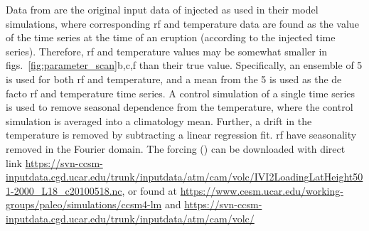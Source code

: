 \documentclass{ametsocV6.1}
\newcommand{\iso}[1][i]{{#1}njected \ce{SO2}}
\begin{document}
%






%



\appendix


Data from \citet{ottobliesner2016} are the original input data of \iso{} as used in
their model simulations, where corresponding \gls{rf} and temperature data are found as
the value of the time series at the time of an eruption (according to the \iso{} time
series). Therefore, \gls{rf} and temperature values may be somewhat smaller in
figs.~\ref{fig:parameter_scan}b,c,f than their true value. Specifically, an ensemble of
5 is used for both \gls{rf} and temperature, and a mean from the 5 is used as the de
facto \gls{rf} and temperature time series. A control simulation of a single time series
is used to remove seasonal dependence from the temperature, where the control simulation
is averaged into a climatology mean. Further, a drift in the temperature is removed by
subtracting a linear regression fit. \gls{rf} have seasonality removed in the Fourier
domain. The forcing () can be downloaded with direct link
\url{https://svn-ccsm-inputdata.cgd.ucar.edu/trunk/inputdata/atm/cam/volc/IVI2LoadingLatHeight501-2000_L18_c20100518.nc},
or found at \url{https://www.cesm.ucar.edu/working-groups/paleo/simulations/ccsm4-lm}
and \url{https://svn-ccsm-inputdata.cgd.ucar.edu/trunk/inputdata/atm/cam/volc/}
\end{document}
